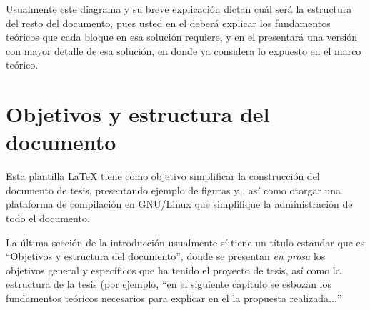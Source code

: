 Usualmente este diagrama y su breve explicación dictan cuál será la
estructura del resto del documento, pues usted en el
 deberá explicar los fundamentos teóricos que
cada bloque en esa solución requiere, y en el
 presentará una versión con mayor detalle de
esa solución, en donde ya considera lo expuesto en el marco teórico.



\section{Objetivos y estructura del documento}

Esta plantilla LaTeX tiene como objetivo simplificar la construcción del
documento de tesis, presentando ejemplo de figuras y \tablas, así como otorgar
una plataforma de compilación en GNU/Linux que simplifique la administración de
todo el documento.

La última sección de la introducción usualmente sí tiene un título estandar que
es ``Objetivos y estructura del documento'', donde se presentan \emph{en prosa}
los objetivos general y específicos que ha tenido el proyecto de tesis,
así como la estructura de la tesis (por ejemplo, ``en el siguiente capítulo se
esbozan los fundamentos teóricos necesarios para explicar en el
 la propuesta realizada$\ldots$''

